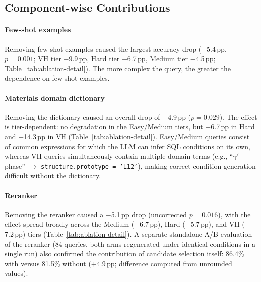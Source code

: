 \subsection{Component-wise Contributions}
\label{sec:reranker_discussion}

\paragraph*{Few-shot examples}
Removing few-shot examples caused the largest accuracy drop ($-$5.4\,pp, $p=0.001$; VH tier $-$9.9\,pp, Hard tier $-$6.7\,pp, Medium tier $-$4.5\,pp; Table~\ref{tab:ablation-detail}). The more complex the query, the greater the dependence on few-shot examples.

\paragraph*{Materials domain dictionary}
Removing the dictionary caused an overall drop of $-$4.9\,pp ($p=0.029$). The effect is tier-dependent: no degradation in the Easy/Medium tiers, but $-$6.7\,pp in Hard and $-$14.3\,pp in VH (Table~\ref{tab:ablation-detail}). Easy/Medium queries consist of common expressions for which the LLM can infer SQL conditions on its own, whereas VH queries simultaneously contain multiple domain terms (e.g., ``$\gamma'$ phase'' $\to$ \texttt{structure.prototype = 'L12'}), making correct condition generation difficult without the dictionary.

\paragraph*{Reranker}
Removing the reranker caused a $-$5.1\,pp drop (uncorrected $p=0.016$), with the effect spread broadly across the Medium ($-$6.7\,pp), Hard ($-$5.7\,pp), and VH ($-$7.2\,pp) tiers (Table~\ref{tab:ablation-detail}). A separate standalone A/B evaluation of the reranker (84 queries, both arms regenerated under identical conditions in a single run) also confirmed the contribution of candidate selection itself: 86.4\% with versus 81.5\% without ($+$4.9\,pp; difference computed from unrounded values).

